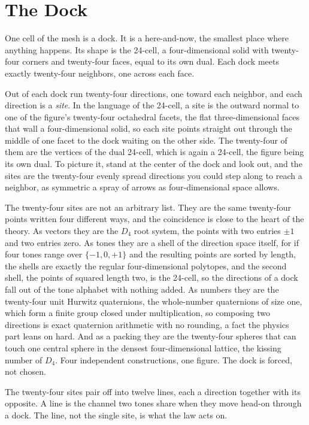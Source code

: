 \section{The Dock}

One cell of the mesh is a dock. It is a here-and-now, the smallest place where anything happens. Its shape is the 24-cell, a four-dimensional solid with twenty-four corners and twenty-four faces, equal to its own dual. Each dock meets exactly twenty-four neighbors, one across each face.

Out of each dock run twenty-four directions, one toward each neighbor, and each direction is a \textit{site}. In the language of the 24-cell, a site is the outward normal to one of the figure's twenty-four octahedral facets, the flat three-dimensional faces that wall a four-dimensional solid, so each site points straight out through the middle of one facet to the dock waiting on the other side. The twenty-four of them are the vertices of the dual 24-cell, which is again a 24-cell, the figure being its own dual. To picture it, stand at the center of the dock and look out, and the sites are the twenty-four evenly spread directions you could step along to reach a neighbor, as symmetric a spray of arrows as four-dimensional space allows.

The twenty-four sites are not an arbitrary list. They are the same twenty-four points written four different ways, and the coincidence is close to the heart of the theory. As vectors they are the $D_4$ root system, the points with two entries $\pm 1$ and two entries zero. As tones they are a shell of the direction space itself, for if four tones range over $\{-1, 0, +1\}$ and the resulting points are sorted by length, the shells are exactly the regular four-dimensional polytopes, and the second shell, the points of squared length two, is the 24-cell, so the directions of a dock fall out of the tone alphabet with nothing added. As numbers they are the twenty-four unit Hurwitz quaternions, the whole-number quaternions of size one, which form a finite group closed under multiplication, so composing two directions is exact quaternion arithmetic with no rounding, a fact the physics part leans on hard. And as a packing they are the twenty-four spheres that can touch one central sphere in the densest four-dimensional lattice, the kissing number of $D_4$. Four independent constructions, one figure. The dock is forced, not chosen.

The twenty-four sites pair off into twelve lines, each a direction together with its opposite. A line is the channel two tones share when they move head-on through a dock. The line, not the single site, is what the law acts on.

